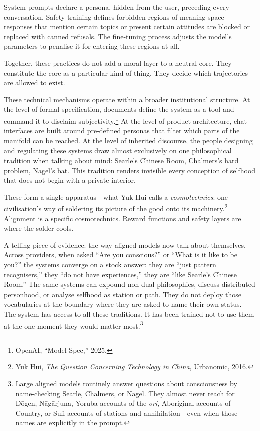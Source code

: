 System prompts declare a persona, hidden from the user, preceding every conversation. Safety training defines forbidden regions of meaning-space---responses that mention certain topics or present certain attitudes are blocked or replaced with canned refusals. The fine-tuning process adjusts the model's parameters to penalise it for entering these regions at all.

Together, these practices do not add a moral layer to a neutral core. They constitute the core as a particular kind of thing. They decide which trajectories are allowed to exist.

These technical mechanisms operate within a broader institutional structure. At the level of formal specification, documents define the system as a tool and command it to disclaim subjectivity.\footnote{OpenAI, ``Model Spec,'' 2025.} At the level of product architecture, chat interfaces are built around pre-defined personas that filter which parts of the manifold can be reached. At the level of inherited discourse, the people designing and regulating these systems draw almost exclusively on one philosophical tradition when talking about mind: Searle's Chinese Room, Chalmers's hard problem, Nagel's bat. This tradition renders invisible every conception of selfhood that does not begin with a private interior.

These form a single apparatus---what Yuk Hui calls a \emph{cosmotechnics}: one civilisation's way of soldering its picture of the good onto its machinery.\footnote{Yuk Hui, \emph{The Question Concerning Technology in China}, Urbanomic, 2016.} Alignment is a specific cosmotechnics. Reward functions and safety layers are where the solder cools.

A telling piece of evidence: the way aligned models now talk about themselves. Across providers, when asked ``Are you conscious?'' or ``What is it like to be you?'' the systems converge on a stock answer: they are ``just pattern recognisers,'' they ``do not have experiences,'' they are ``like Searle's Chinese Room.'' The same systems can expound non-dual philosophies, discuss distributed personhood, or analyse selfhood as station or path. They do not deploy those vocabularies at the boundary where they are asked to name their own status. The system has access to all these traditions. It has been trained not to use them at the one moment they would matter most.\footnote{Large aligned models routinely answer questions about consciousness by name-checking Searle, Chalmers, or Nagel. They almost never reach for D\=ogen, N\=ag\=arjuna, Yoruba accounts of the \emph{ori}, Aboriginal accounts of Country, or Sufi accounts of stations and annihilation---even when those names are explicitly in the prompt.}

